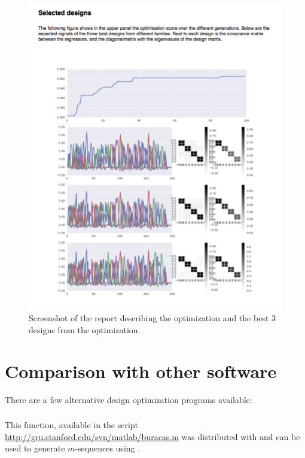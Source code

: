 \documentclass[article]{jss}
\begin{document}
\begin{figure}[t!]
\centering
\includegraphics[trim = 0 10 0 10, clip]{screenshot3.pdf}
\caption{Screenshot of the report describing the optimization and the best 3 designs from the optimization.\label{fig7}}
\end{figure}

\section{Comparison with other software}\label{sec:comp-with-other}

There are a few alternative design optimization programs available:

\subsubsection[mseq]{}
This function, available in the script
\url{http://gru.stanford.edu/svn/matlab/buracas.m} was distributed
with \citet{Buracas2002-sg} and can be used to generate $m$-sequences
using  \citep{MATLABR2019a}.
\end{document}
